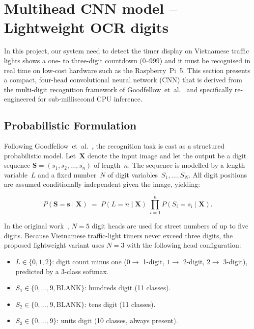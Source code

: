 \section{Multihead CNN model -- Lightweight OCR digits}

In this project, our system need to detect the timer display on Vietnamese traffic lights shows a one- to three-digit countdown
(0--999) and it must be recognised in real time on low-cost hardware such as the
Raspberry~Pi~5.  This section presents a compact, four-head convolutional neural network
(CNN) that is derived from the multi-digit recognition framework of
Goodfellow~et~al.~\cite{goodfellow2014multidigitnumberrecognitionstreet} and specifically re-engineered
for sub-millisecond CPU inference.

\subsection{Probabilistic Formulation}
\label{sec:cnn_prob}

Following Goodfellow~et~al.~\cite{goodfellow2014multidigitnumberrecognitionstreet}, the recognition
task is cast as a structured probabilistic model.  Let~$\mathbf{X}$ denote the
input image and let the output be a digit sequence
$\mathbf{S} = (s_1, s_2, \dots, s_n)$ of length~$n$.
The sequence is modelled by a length variable~$L$ and a fixed number~$N$
of digit variables~$S_1, \dots, S_N$.  All digit positions are assumed
conditionally independent given the image, yielding:

\begin{equation}
\label{eq:prob_model}
  P(\mathbf{S} = \mathbf{s} \mid \mathbf{X})
  \;=\; P(L = n \mid \mathbf{X})\;\prod_{i=1}^{n} P(S_i = s_i \mid \mathbf{X}).
\end{equation}

In the original work~\cite{goodfellow2014multidigitnumberrecognitionstreet}, $N{=}5$ digit heads are
used for street numbers of up to five digits.  Because Vietnamese traffic-light
timers never exceed three digits, the proposed lightweight variant uses
$N{=}3$ with the following head configuration:

\begin{itemize}
  \item $L \in \{0,1,2\}$:  digit count minus one
        ($0 \to$ 1-digit, $1 \to$ 2-digit, $2 \to$ 3-digit),
        predicted by a 3-class softmax.
  \item $S_1 \in \{0,\dots,9,\text{BLANK}\}$:  hundreds digit (11 classes).
  \item $S_2 \in \{0,\dots,9,\text{BLANK}\}$:  tens digit    (11 classes).
  \item $S_3 \in \{0,\dots,9\}$:                 units digit  (10 classes,
        always present).
\end{itemize}

